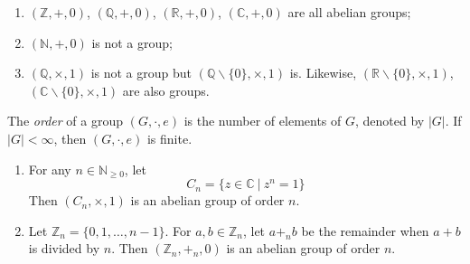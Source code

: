 \documentclass[10pt, a4paper, twoside]{report}
\begin{document}
\begin{enumerate}
    \item \((\mathbb{Z},+,0)\), \((\mathbb{Q},+,0)\), \((\mathbb{R},+,0)\), \((\mathbb{C},+,0)\) are all abelian groups;
    \item \((\mathbb{N},+,0)\) is not a group;
    \item \((\mathbb{Q},\times,1)\) is not a group but \((\mathbb{Q}\backslash\{0\},\times,1)\) is. Likewise, \((\mathbb{R}\backslash\{0\},\times,1)\), \((\mathbb{C}\backslash\{0\},\times,1)\) are also groups.
\end{enumerate}
\begin{definition}
    The \emph{order} of a group \((G,\cdot,e)\) is the number of elements of \(G\), denoted by \(|G|\). If \(|G|<\infty\), then \((G,\cdot,e)\) is finite.
\end{definition}
\begin{example} \item[] 
    \begin{enumerate}
        \item For any \(n\in\mathbb{N}_{\geq 0}\), let 
        \[C_n=\{z\in\mathbb{C}\:|\:z^n=1\}\]
        Then \((C_n,\times,1)\) is an abelian group of order \(n\).
        \item Let \(\mathbb{Z}_n=\{0,1,\ldots,n-1\}\). For \(a,b\in\mathbb{Z}_n\), let \(a+_n b\) be the remainder when \(a+b\) is divided by \(n\). Then \((\mathbb{Z}_n,+_n,0)\) is an abelian group of order \(n\).
    \end{enumerate}
\end{example}
\end{document}
